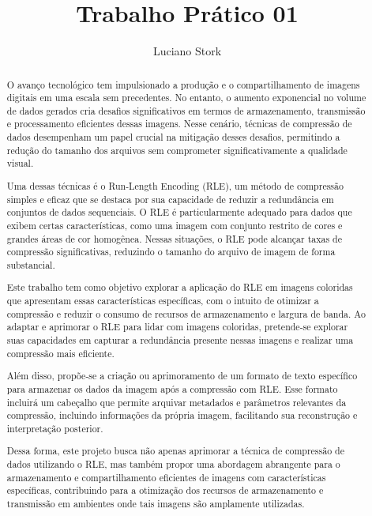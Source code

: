 \documentclass{article}
\title{Trabalho Prático 01}
\author{Luciano Stork}
\begin{document}
\maketitle

\begin{abstract}

O avanço tecnológico tem impulsionado a produção e o compartilhamento de imagens digitais em uma escala sem precedentes. No entanto, o aumento exponencial no volume de dados gerados cria desafios significativos em termos de armazenamento, transmissão e processamento eficientes dessas imagens. Nesse cenário, técnicas de compressão de dados desempenham um papel crucial na mitigação desses desafios, permitindo a redução do tamanho dos arquivos sem comprometer significativamente a qualidade visual.

Uma dessas técnicas é o Run-Length Encoding (RLE), um método de compressão simples e eficaz que se destaca por sua capacidade de reduzir a redundância em conjuntos de dados sequenciais. O RLE é particularmente adequado para dados que exibem certas características, como uma imagem com conjunto restrito de cores e grandes áreas de cor homogênea. Nessas situações, o RLE pode alcançar taxas de compressão significativas, reduzindo o tamanho do arquivo de imagem de forma substancial.

Este trabalho tem como objetivo explorar a aplicação do RLE em imagens coloridas que apresentam essas características específicas, com o intuito de otimizar a compressão e reduzir o consumo de recursos de armazenamento e largura de banda. Ao adaptar e aprimorar o RLE para lidar com imagens coloridas, pretende-se explorar suas capacidades em capturar a redundância presente nessas imagens e realizar uma compressão mais eficiente.

Além disso, propõe-se a criação ou aprimoramento de um formato de texto específico para armazenar os dados da imagem após a compressão com RLE. Esse formato incluirá um cabeçalho que permite arquivar metadados e parâmetros relevantes da compressão, incluindo informações da própria imagem, facilitando sua reconstrução e interpretação posterior.

Dessa forma, este projeto busca não apenas aprimorar a técnica de compressão de dados utilizando o RLE, mas também propor uma abordagem abrangente para o armazenamento e compartilhamento eficientes de imagens com características específicas, contribuindo para a otimização dos recursos de armazenamento e transmissão em ambientes onde tais imagens são amplamente utilizadas.

\end{abstract}
\end{document}
